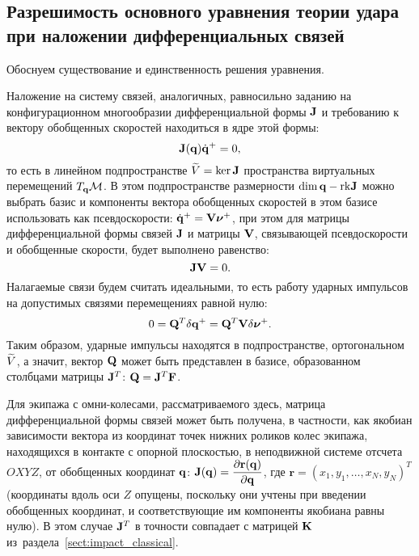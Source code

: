 
\subsection{Разрешимость основного уравнения теории удара при наложении дифференциальных связей}

Обоснуем существование и единственность решения уравнения.

Наложение на систему связей, аналогичных, равносильно заданию на конфигурационном многообразии дифференциальной формы $\mathbf{J}$ и требованию к вектору обобщенных скоростей находиться в ядре этой формы:
\begin{equation}\label{eq:constraints_form}
    \mathbf{J}(\mathbf{q})\dot{\mathbf{q}}^+ = 0,
\end{equation}
то есть в линейном подпространстве $\widetilde{V} = \ker \mathbf{J}$ пространства виртуальных перемещений $T_{\mathbf{q}}\mathcal{M}$. В этом подпространстве размерности $\dim \mathbf{q} - \mathrm{rk} \mathbf{J}$ можно выбрать базис и компоненты вектора обобщенных скоростей в этом базисе использовать как псевдоскорости: $\dot{\mathbf{q}}^+ = \mathbf{V}\boldsymbol{\mathbf{\nu}}^+$, при этом для матрицы дифференциальной формы связей $\mathbf{J}$ и матрицы $\mathbf{V}$, связывающей псевдоскорости и обобщенные скорости, будет выполнено равенство:
\begin{equation}\label{eq:constraints_orth}
    \mathbf{J}\mathbf{V} = 0.    
\end{equation}
Налагаемые связи будем считать идеальными, то есть работу ударных импульсов на допустимых связями перемещениях равной нулю:
\begin{equation}\label{eq:constraints_ideal}
    0 = \mathbf{Q}^T \delta\mathbf{q}^+ = \mathbf{Q}^T \mathbf{V}\delta\boldsymbol{\mathbf{\nu}}^+.
\end{equation}
Таким образом, ударные импульсы находятся в подпространстве, ортогональном $\widetilde{V}$, а значит, вектор $\mathbf{Q}$ может быть представлен в базисе, образованном столбцами матрицы $\mathbf{J}^T$: $\mathbf{Q} = \mathbf{J}^T\mathbf{F}$.

Для экипажа с омни-колесами, рассматриваемого здесь, матрица дифференциальной формы связей может быть получена, в частности, как якобиан зависимости вектора из координат точек нижних роликов колес экипажа, находящихся в контакте с опорной плоскостью, в неподвижной системе отсчета $OXYZ$, от обобщенных координат $\mathbf{q}$: $\mathbf{J}(\mathbf{q}) = \displaystyle\frac{\displaystyle \partial \mathbf{r}(\mathbf{q})}{\displaystyle \partial \mathbf{q}}$, где $\mathbf{r} = ( x_1, y_1, \ldots, x_N, y_N )^T$ (координаты вдоль оси $Z$ опущены, поскольку они учтены при введении обобщенных координат, и соответствующие им компоненты якобиана равны нулю). В этом случае $\mathbf{J}^T$ в точности совпадает с матрицей $\mathbf{K}$ из~раздела~\ref{sect:impact_classical}.

